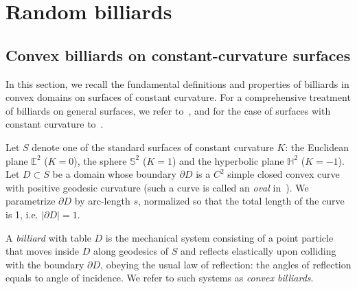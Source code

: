 \documentclass[a4paper,12pt,reqno]{amsart}
\numberwithin{equation}{section}
\begin{document}
\section{Random billiards}
\label{sec:billiards}
\subsection{Convex billiards on constant-curvature surfaces}

In this section, we recall the fundamental definitions and properties of billiards in convex domains on surfaces of constant curvature. For a comprehensive treatment of billiards on general surfaces, we refer to~\cite{DiasCarneiro:2024}, and for the case of surfaces with constant curvature to~\cite{dosSantos:2017}.

Let $S$ denote one of the standard surfaces of constant curvature $K$: the Euclidean plane $\mathbb{E}^2$ ($K=0$), the sphere $\mathbb{S}^2$ ($K=1$) and the hyperbolic plane $\mathbb{H}^2$ ($K=-1$). Let $D \subset S$ be a domain whose boundary $\partial D$ is a $C^2$ simple closed convex curve with positive geodesic curvature (such a curve is called an \emph{oval} in~\cite{dosSantos:2017,DiasCarneiro:2024}). We parametrize $\partial D$ by arc-length $s$, normalized so that the total length of the curve is 1, i.e. $|\partial D|=1$.

A \emph{billiard} with table $D$ is the mechanical system consisting of a point particle that moves inside $D$ along geodesics of $S$ and reflects elastically upon colliding with the boundary $\partial D$, obeying the usual law of reflection: the angles of reflection equals to angle of incidence. We refer to such systems as \emph{convex billiards}.
\end{document}
